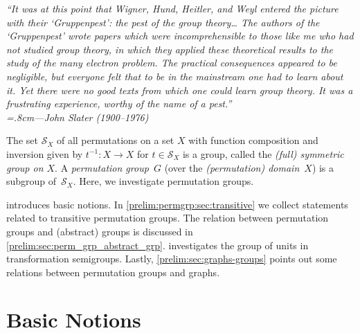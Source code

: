 

\begin{flushright}
	\itshape %
	``It was at this point that Wigner, Hund, Heitler, and Weyl entered the picture with their `Gruppenpest': the pest of the group theory… The authors of the `Gruppenpest' wrote papers which were incomprehensible to those like me who had not studied group theory, in which they applied these theoretical results to the study of the many electron problem. The practical consequences appeared to be negligible, but everyone felt that to be in the mainstream one had to learn about it. Yet there were no good texts from which one could learn group theory. It was a frustrating experience, worthy of the name of a pest.''  \\ \normalfont
	\vspace{.2em}
	\rightskip=.8cm---John Slater (1900--1976)
\end{flushright}

The set $\mathcal S_X$ of all permutations on a set $X$
with function composition
and inversion given by $t^{-1} \colon X \to X$ 
for $t \in \mathcal S_X$ is a group, called the \emph{(full) symmetric group on $X$}.
%
%
%
%
A \emph{permutation group~$G$} (over the \emph{(permutation) domain}~$X$) is a subgroup of~$\mathcal S_X$.
Here, we investigate permutation groups.

 introduces basic notions. In \cref{prelim:permgrp:sec:transitive}
we collect statements related to transitive permutation groups.
The relation between permutation groups and (abstract) groups
is discussed in \cref{prelim:sec:perm_grp_abstract_grp}.  investigates
the group of units in transformation semigroups.
Lastly, \cref{prelim:sec:graphs-groups} points out some relations between permutation groups and graphs.

\section{Basic Notions}
\label{prelim:sec:basic}

